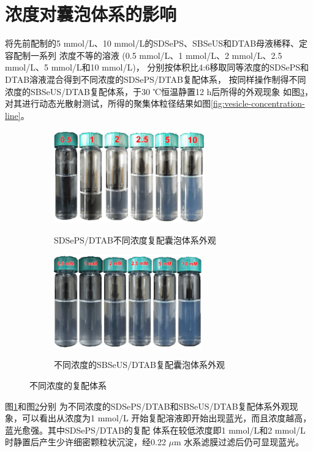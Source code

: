 \documentclass[bachelor,winfonts,replaceperiod]{jnuthesis}
\begin{document}
    \section{浓度对囊泡体系的影响}
    将先前配制的5 mmol/L、10 mmol/L的SDSePS、SBSeUS和DTAB母液稀释、定容配制一系列
    浓度不等的溶液 (0.5 mmol/L、1 mmol/L、2 mmol/L、2.5 mmol/L、5 mmol/L和10 mmol/L)，
    分别按体积比4:6移取同等浓度的SDSePS和DTAB溶液混合得到不同浓度的SDSePS/DTAB复配体系，
    按同样操作制得不同浓度的SBSeUS/DTAB复配体系，于30 ℃恒温静置12 h后所得的外观现象
    如图\ref{fig:不同浓度的复配体系}，对其进行动态光散射测试，所得的聚集体粒径结果如图\ref{fig:vesicle-concentration-line}。
    \begin{figure}[htbp]
        \centering
        \begin{subfigure}[]{\textwidth}
            \centering
            \includegraphics[height=4cm]{figure/SDSePS-concentration.png}\\
            \caption{SDSePS/DTAB不同浓度复配囊泡体系外观}\label{fig:vesicle-SDSePS-concentration}
        \end{subfigure}%
        
        \begin{subfigure}[]{\textwidth}
            \centering
            \includegraphics[height=4cm]{figure/SBSeUS-concentration.png}\\
            \caption{不同浓度的SBSeUS/DTAB复配囊泡体系外观}\label{fig:vesicle-SBSeUS-concentration}
        \end{subfigure}%
        \caption{不同浓度的复配体系}
        \label{fig:不同浓度的复配体系}
    \end{figure}
    
    图\ref{fig:vesicle-SDSePS-concentration}和图\ref{fig:vesicle-SBSeUS-concentration}分别
    为不同浓度的SDSePS/DTAB和SBSeUS/DTAB复配体系外观现象，可以看出从浓度为1 mmol/L
    开始复配溶液即开始出现蓝光，而且浓度越高，蓝光愈强。其中SDSePS/DTAB的复配
    体系在较低浓度即1 mmol/L和2 mmol/L时静置后产生少许细密颗粒状沉淀，经0.22 $\mu$m
    水系滤膜过滤后仍可显现蓝光。
    
\end{document}
